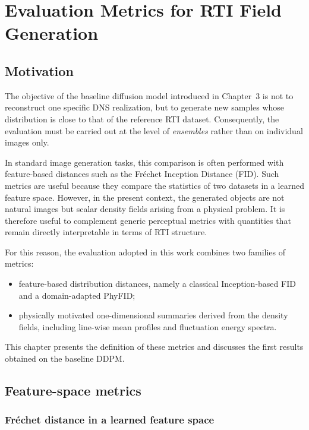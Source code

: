 \chapter{Evaluation Metrics for RTI Field Generation}

\section{Motivation}

The objective of the baseline diffusion model introduced in Chapter~3 is not to
reconstruct one specific DNS realization, but to generate new samples whose
distribution is close to that of the reference RTI dataset. Consequently, the
evaluation must be carried out at the level of \emph{ensembles} rather than on
individual images only.

In standard image generation tasks, this comparison is often performed with
feature-based distances such as the Fr\'echet Inception Distance (FID). Such
metrics are useful because they compare the statistics of two datasets in a
learned feature space. However, in the present context, the generated objects
are not natural images but scalar density fields arising from a physical
problem. It is therefore useful to complement generic perceptual metrics with
quantities that remain directly interpretable in terms of RTI structure.

For this reason, the evaluation adopted in this work combines two families of
metrics:

\begin{itemize}
    \item feature-based distribution distances, namely a classical
    Inception-based FID and a domain-adapted PhyFID;
    \item physically motivated one-dimensional summaries derived from the
    density fields, including line-wise mean profiles and fluctuation energy
    spectra.
\end{itemize}

This chapter presents the definition of these metrics and discusses the first
results obtained on the baseline DDPM.


\section{Feature-space metrics}

\subsection{Fr\'echet distance in a learned feature space}

